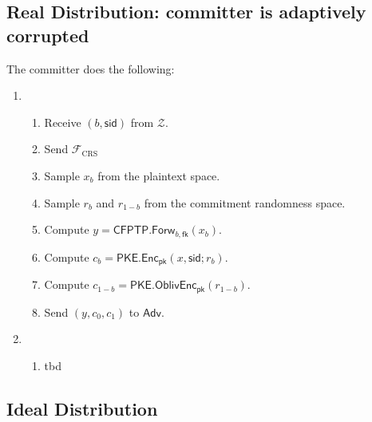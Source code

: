 \documentclass[11pt,letterpaper]{article}
\theoremstyle{plain} %
\theoremstyle{definition} %
\theoremstyle{remark} %
\newcommand{\Input}{x}
\newcommand{\PKE}{\mathsf{PKE}}
\newcommand{\Enc}{\mathsf{Enc}}
\newcommand{\OblivEnc}{\mathsf{OblivEnc}}
\newcommand{\EncKey}{\mathsf{pk}}
\newcommand{\Ciphertext}{c}
\newcommand{\Rand}{r}
\newcommand{\CFPTP}{\mathsf{CFPTP}}
\newcommand{\Forw}{\mathsf{Forw}}
\newcommand{\ForwKey}{\mathsf{fk}}
\newcommand{\CFPTPOutput}{y}
\newcommand{\Adversary}{{\mathsf{Adv}}} %
\newcommand{\Environment}{{\mathcal{Z}}} %
\newcommand{\IF}{\mathcal{F}} %
\newcommand{\sid}{\mathsf{sid}}
\newcommand{\IFCrs}{\IF_{\mathrm{CRS}}}
\newcommand{\CommittedBit}{b}
\begin{document}
\subsection{Real Distribution: committer is adaptively corrupted}
\label{sec:real-distribution}

\begin{minipage}{0.9\textwidth}
 The committer does the following:
\begin{enumerate}[nolistsep]
	\item {}

	\begin{enumerate}[nolistsep]
		\item Receive $(\CommittedBit,\sid)$ from $\Environment$.
		\item Send $\IFCrs$
		\item Sample $\Input_{\CommittedBit}$ from the plaintext space.
		\item Sample $\Rand_{\CommittedBit}$ and $\Rand_{1-\CommittedBit}$ from the commitment randomness space.
		\item Compute $\CFPTPOutput = \CFPTP.\Forw_{\CommittedBit, \ForwKey}(\Input_{\CommittedBit})$.
		\item Compute $\Ciphertext_{\CommittedBit} = \PKE.\Enc_\EncKey(\Input, \sid; \Rand_\CommittedBit)$.
		\item Compute $\Ciphertext_{1-\CommittedBit} = \PKE.\OblivEnc_\EncKey(\Rand_{1-\CommittedBit})$.
		\item Send $(\CFPTPOutput, \Ciphertext_0, \Ciphertext_1)$ to $\Adversary$.
	\end{enumerate}

	\item {}

	\begin{enumerate}[nolistsep]
		\item tbd
	\end{enumerate}
\end{enumerate}
\end{minipage}

\subsection{Ideal Distribution}
\label{sec:ideal-distribution}
\end{document}
